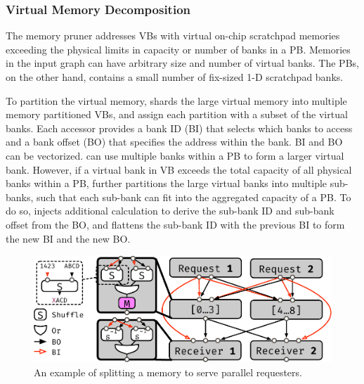 \subsubsection{Virtual Memory Decomposition} \label{sec:memsplit}
The memory pruner addresses VBs with virtual on-chip scratchpad memories exceeding the physical limits in capacity or number of banks in a PB.
Memories in the input graph can have arbitrary size and number of virtual banks.
The PBs, on the other hand, contains a small number of fix-sized 1-D scratchpad banks.

To partition the virtual memory, \name{} shards the large virtual memory into multiple memory partitioned VBs, and assign each partition with a subset of the virtual banks.
Each accessor provides a bank ID (BI) that selects which banks to access and a bank offset (BO) that specifies the address within the bank. 
BI and BO can be vectorized.
\name{} can use multiple banks within a PB to form a larger virtual bank.
However, if a virtual bank in VB exceeds the total capacity of all physical banks within a PB, \name{} further partitions the large virtual banks into multiple sub-banks, such that each sub-bank can fit into the aggregated capacity of a PB.
To do so, \name{} injects additional calculation to derive the sub-bank ID and sub-bank offset from the BO, and flattens the sub-bank ID with the previous BI to form the new BI and the new BO.


\begin{figure}
  \centering
  \includegraphics[width=1\columnwidth]{figures/memsplit.pdf}
  \caption{An example of splitting a memory to serve parallel requesters.}
  \label{fig:memsplit}
\end{figure}


